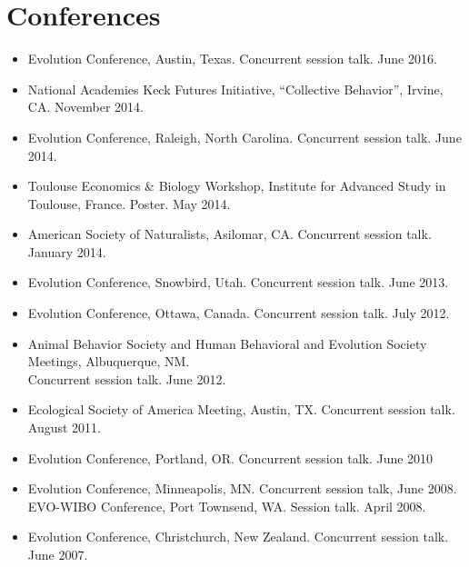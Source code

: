 \documentclass[11pt]{article}
\begin{document}
  \section{Conferences}

  \begin{itemize}
  \item Evolution Conference, Austin, Texas. Concurrent session talk. June 2016.
  \item National Academies Keck Futures Initiative, ``Collective Behavior'', Irvine, CA. November 2014.
  \item Evolution Conference, Raleigh, North Carolina. Concurrent session talk. June 2014.
  \item Toulouse Economics \& Biology Workshop, Institute for Advanced Study in Toulouse, France. Poster. May 2014.
  \item American Society of Naturalists, Asilomar, CA. Concurrent session talk. January 2014.
  \item Evolution Conference, Snowbird, Utah. Concurrent session talk. June 2013.
  \item Evolution Conference, Ottawa, Canada. Concurrent session talk. July 2012.
  \item Animal Behavior Society and Human Behavioral and Evolution Society Meetings, Albuquerque, NM.  \\
    Concurrent session talk.  June 2012.
  \item %
    Ecological Society of America Meeting, Austin, TX. Concurrent session talk. August 2011.
  \item %
    Evolution Conference, Portland, OR. Concurrent session talk. June 2010
  \item %
    Evolution Conference, Minneapolis, MN. Concurrent session talk, June 2008. \\
    EVO-WIBO Conference, Port Townsend, WA. Session talk. April 2008. 
  \item %
    Evolution Conference, Christchurch, New Zealand. Concurrent session talk. June 2007. 
  \end{itemize}
\end{document}

